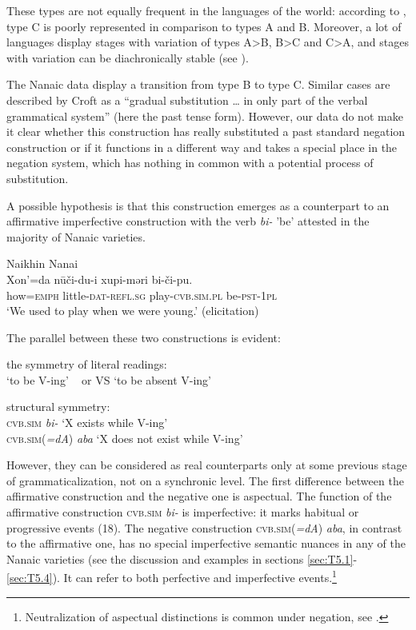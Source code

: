\documentclass[output=paper,colorlinks,citecolor=brown]{langscibook}
\begin{document}
These types are not equally frequent in the languages of the world: according to \citet[147]{Veselinova2016}, type C is poorly represented in comparison to types A and B. Moreover, a lot of languages display stages with variation of types A>B, B>C and C>A, and stages with variation can be diachronically stable (see \citealp[158]{Veselinova2016}).

The Nanaic data display a transition from type B to type C. Similar cases are described by Croft as a ``gradual substitution … in only part of the verbal grammatical system” \citeyearpar[10]{Croft1991} (here the past tense form). However, our data do not make it clear whether this construction has really substituted a past standard negation construction or if it functions in a different way and takes a special place in the negation system, which has nothing in common with a potential process of substitution.

A possible hypothesis is that this construction emerges as a counterpart to an affirmative imperfective construction with the verb \textit{bi-} 'be’ attested in the majority of Nanaic varieties.

\ea Naikhin Nanai \label{ex:T18}\\
	\gll Xon’=da	nūči-du-i	xupi-məri	bi-či-pu.\\
	how=\textsc{emph}	little-\textsc{dat-refl.sg}	play-\textsc{cvb.sim.pl}	be-\textsc{pst-1pl}\\
	\glt `We used to play when we were young.' (elicitation)
\z

The parallel between these two constructions is evident:

\begin{exe}\label{ex:T19}
    \ex the symmetry of literal readings:\\
    `to be V-ing' ~ or VS `to be absent V-ing' 
\end{exe}

\begin{exe}
    \ex structural symmetry:\\\label{ex:T20}
    \textsc{cvb.sim} \textit{bi-} `X exists while V-ing'\\
    \textsc{cvb.sim}(\textit{=dA}) \textit{aba} `X does not exist while V-ing'
\end{exe}

However, they can be considered as real counterparts only at some previous stage of grammaticalization, not on a synchronic level. The first difference between the affirmative construction and the negative one is aspectual. The function of the affirmative construction \textsc{cvb.sim} \textit{bi-} is imperfective: it marks habitual or progressive events (18). The negative construction \textsc{cvb.sim}(\textit{=dA}) \textit{aba}, in contrast to the affirmative one, has no special imperfective semantic nuances in any of the Nanaic varieties (see the discussion and examples in sections \ref{sec:T5.1}-\ref{sec:T5.4}). It can refer to both perfective and imperfective events.\footnote{Neutralization of aspectual distinctions is common under negation, see \citet{Miestamo2005}.}
\end{document}
